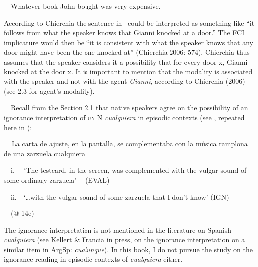 \begin{styleStandard}
\ \ Whatever book John bought was very expensive.
\end{styleStandard}

\begin{styleStandard}
According to Chierchia the sentence in \ could be interpreted as something like “it follows from what the speaker knows that Gianni knocked at a door.” The FCI implicature would then be “it is consistent with what the speaker knows that any door might have been the one knocked at” (Chierchia 2006: 574). Chierchia thus assumes that the speaker considers it a possibility that for every door x, Gianni knocked at the door x. It is important to mention that the modality is associated with the speaker and not with the agent \textit{Gianni}, according to Chierchia (2006) (see 2.3 for agent’s modality). 
\end{styleStandard}

\begin{styleStandard}
\ \ Recall from the Section 2.1 that native speakers agree on the possibility of an ignorance interpretation of \textsc{un} N \textit{cualquiera} in episodic contexts (see , repeated here in ):
\end{styleStandard}

\begin{styleStandard}
\label{bkm:Ref72400981}\textbf{\ \ }La carta de ajuste, en la pantalla, se complementaba con la música ramplona de una zarzuela cualquiera 
\end{styleStandard}

\begin{styleStandard}
\ \ i. \ \ ‘The testcard, in the screen, was complemented with the vulgar sound of some ordinary zarzuela’ \ \ (EVAL)
\end{styleStandard}

\begin{styleStandard}
\ \ ii.\ \ ‘…with the vulgar sound of some zarzuela that I don’t know’ (IGN)
\end{styleStandard}

\begin{styleStandard}
\ \ (@ 14e)
\end{styleStandard}

\begin{styleStandard}
The ignorance interpretation is not mentioned in the literature on Spanish \textit{cualquiera} (see Kellert \& Francia in press, on the ignorance interpretation on a similar item in ArgSp: \textit{cualunque}). In this book, I do not pursue the study on the ignorance reading in episodic contexts of \textit{cualquiera} either. 
\end{styleStandard}

